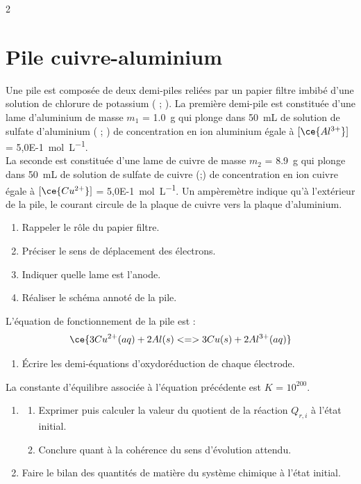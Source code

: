 \documentclass[a4paper,11pt,fleqn]{article}%
\begin{document}
\begin{multicols}{2}
\section{Pile cuivre-aluminium}
Une pile est composée de deux demi-piles reliées par un papier filtre imbibé d'une solution de chlorure de potassium ( ; ). La première demi-pile est constituée d'une lame d'aluminium de masse $m_1$ = \SI{1,0}{\gram} qui plonge dans \SI{50}{\milli\liter} de solution de sulfate d'aluminium ( ; ) de concentration en ion aluminium  égale à $[\ce{Al^{3+}}]$ = \SI{5,0E-1}{\mole\per\liter}.\\
La seconde est constituée d'une lame de cuivre de masse $m_2$ = \SI{8,9}{\gram} qui plonge dans \SI{50}{mL} de solution de sulfate de cuivre (;) de concentration en ion cuivre  égale à $[\ce{Cu^{2+}}]$ = \SI{5,0E-1}{\mole\per\liter}. Un ampèremètre indique qu'à l'extérieur de la pile, le courant circule de la plaque de cuivre vers la plaque d'aluminium.
\begin{enumerate}
    \item Rappeler le rôle du papier filtre.
    \item Préciser le sens de déplacement des électrons.
    \item Indiquer quelle lame est l'anode.
    \item Réaliser le schéma annoté de la pile.
\end{enumerate}
L'équation de fonctionnement de la pile est :
$$\ce{3 Cu^{2+}(aq) + 2 Al(s) <=> 3 Cu(s) + 2 Al^{3+}(aq)}$$
\begin{enumerate}[resume]
    \item Écrire les demi-équations  d'oxydoréduction de chaque électrode.
\end{enumerate}
La constante d'équilibre associée à l'équation précédente est $K$ = $10^{200}$.
\begin{enumerate}[resume]
    \item \begin{enumerate}
        \item Exprimer puis calculer la valeur du quotient de la réaction $Q_{r,i}$ à l'état initial.
        \item Conclure  quant à la cohérence du sens d'évolution attendu.
    \end{enumerate}
    \item Faire le bilan des quantités de matière du système chimique à l'état initial.

\end{enumerate}
\end{multicols}
\end{document}
